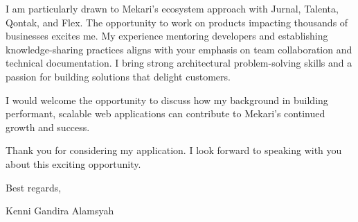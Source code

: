 \documentclass[11pt]{article}
\begin{document}
I am particularly drawn to Mekari's ecosystem approach with Jurnal, Talenta, Qontak, and Flex. The opportunity to work on products impacting thousands of businesses excites me. My experience mentoring developers and establishing knowledge-sharing practices aligns with your emphasis on team collaboration and technical documentation. I bring strong architectural problem-solving skills and a passion for building solutions that delight customers.

I would welcome the opportunity to discuss how my background in building performant, scalable web applications can contribute to Mekari's continued growth and success.

Thank you for considering my application. I look forward to speaking with you about this exciting opportunity.

\vspace{1em}

Best regards,

\vspace{1em}

Kenni Gandira Alamsyah
\end{document}
